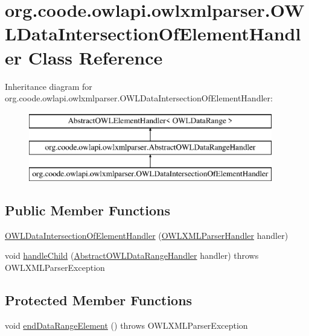 \hypertarget{classorg_1_1coode_1_1owlapi_1_1owlxmlparser_1_1_o_w_l_data_intersection_of_element_handler}{\section{org.\-coode.\-owlapi.\-owlxmlparser.\-O\-W\-L\-Data\-Intersection\-Of\-Element\-Handler Class Reference}
\label{classorg_1_1coode_1_1owlapi_1_1owlxmlparser_1_1_o_w_l_data_intersection_of_element_handler}
}
Inheritance diagram for org.\-coode.\-owlapi.\-owlxmlparser.\-O\-W\-L\-Data\-Intersection\-Of\-Element\-Handler\-:\begin{figure}[H]
\begin{center}
\leavevmode
\includegraphics[height=3.000000cm]{classorg_1_1coode_1_1owlapi_1_1owlxmlparser_1_1_o_w_l_data_intersection_of_element_handler}
\end{center}
\end{figure}
\subsection*{Public Member Functions}
\begin{DoxyCompactItemize}
\item 
\hyperlink{classorg_1_1coode_1_1owlapi_1_1owlxmlparser_1_1_o_w_l_data_intersection_of_element_handler_af2d5a3bbf2151a3449a32fc5b6e1c2c2}{O\-W\-L\-Data\-Intersection\-Of\-Element\-Handler} (\hyperlink{classorg_1_1coode_1_1owlapi_1_1owlxmlparser_1_1_o_w_l_x_m_l_parser_handler}{O\-W\-L\-X\-M\-L\-Parser\-Handler} handler)
\item 
void \hyperlink{classorg_1_1coode_1_1owlapi_1_1owlxmlparser_1_1_o_w_l_data_intersection_of_element_handler_aa2ed940494ea7242b5440e027ce4a716}{handle\-Child} (\hyperlink{classorg_1_1coode_1_1owlapi_1_1owlxmlparser_1_1_abstract_o_w_l_data_range_handler}{Abstract\-O\-W\-L\-Data\-Range\-Handler} handler)  throws O\-W\-L\-X\-M\-L\-Parser\-Exception 
\end{DoxyCompactItemize}
\subsection*{Protected Member Functions}
\begin{DoxyCompactItemize}
\item 
void \hyperlink{classorg_1_1coode_1_1owlapi_1_1owlxmlparser_1_1_o_w_l_data_intersection_of_element_handler_af4087357a84942312f89d2efde7f3011}{end\-Data\-Range\-Element} ()  throws O\-W\-L\-X\-M\-L\-Parser\-Exception 
\end{DoxyCompactItemize}
